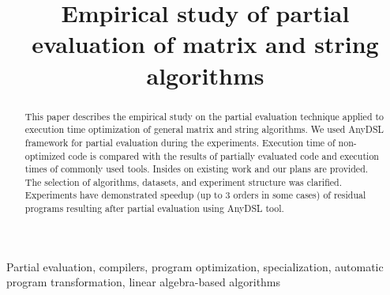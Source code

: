 \documentclass[conference]{IEEEtran}
\begin{document}
\title{Empirical study of partial evaluation of matrix and string algorithms\\

}

\author{
\and
{}
\and
{}
}
\maketitle

\begin{abstract}
	
This paper describes the empirical study on the partial evaluation technique applied to execution time optimization of general matrix and string algorithms. We used AnyDSL framework for partial evaluation during the experiments. Execution time of non-optimized code is compared with the results of partially evaluated code and execution times of commonly used tools. Insides on existing work and our plans are provided. The selection of algorithms, datasets, and experiment structure was clarified. Experiments have demonstrated speedup (up to 3 orders in some cases) of residual programs resulting after partial evaluation using AnyDSL tool.
	
\end{abstract}

\begin{IEEEkeywords}
Partial evaluation, compilers, program optimization, specialization, automatic program transformation, linear algebra-based algorithms
\end{IEEEkeywords}
\end{document}
